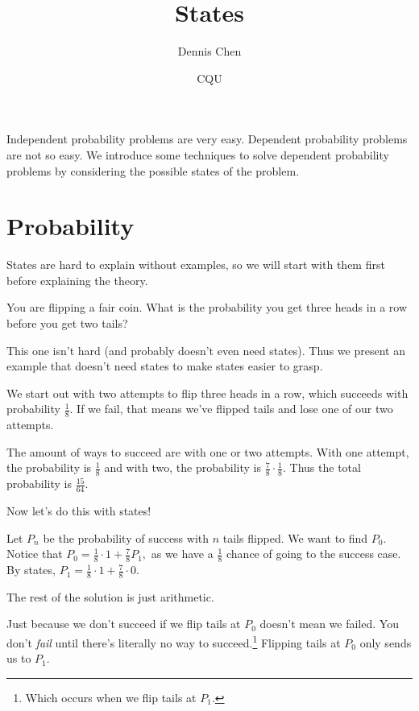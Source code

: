 \documentclass[mast]{lucky}
\title{States}
\author{Dennis Chen}
\date{CQU}
\begin{document}
\maketitle

Independent probability problems are very easy. Dependent probability problems are not so easy. We introduce some techniques to solve dependent probability problems by considering the possible states of the problem.

\section{Probability}
States are hard to explain without examples, so we will start with them first before explaining the theory.

\begin{exam}
You are flipping a fair coin. What is the probability you get three heads in a row before you get two tails?
\end{exam}

This one isn't hard (and probably doesn't even need states). Thus we present an example that doesn't need states to make states easier to grasp.

\begin{sol}[1]
We start out with two attempts to flip three heads in a row, which succeeds with probability $\frac{1}{8}.$ If we fail, that means we've flipped tails and lose one of our two attempts.

The amount of ways to succeed are with one or two attempts. With one attempt, the probability is $\frac{1}{8}$ and with two, the probability is $\frac{7}{8}\cdot\frac{1}{8}.$ Thus the total probability is $\frac{15}{64}.$
\end{sol}

Now let's do this with states!

\begin{sol}[2]
Let $P_n$  be the probability of success with $n$ tails flipped. We want to find $P_0.$ Notice that $P_0=\frac{1}{8}\cdot 1+\frac{7}{8}P_1,$ as we have a $\frac{1}{8}$ chance of going to the success case. By states, $P_1=\frac{1}{8}\cdot 1+\frac{7}{8}\cdot 0.$

The rest of the solution is just arithmetic.
\end{sol}
Just because we don't succeed if we flip tails at $P_0$ doesn't mean we failed. You don't \textit{fail} until there's literally no way to succeed.\footnote{Which occurs when we flip tails at $P_1.$} Flipping tails at $P_0$ only sends us to $P_1.$
\end{document}
